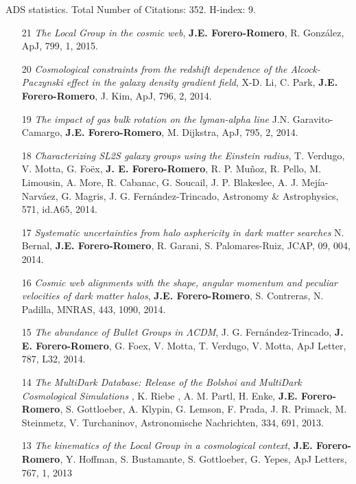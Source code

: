 \documentclass[letterpaper,11pt,onecolumn]{article}
\begin{document}
ADS statistics. Total Number of Citations: 352. H-index: 9.
\begin{enumerate}



\item[21]{\it The Local Group in the cosmic web}, {\bf
  J.E. Forero-Romero}, R. Gonz\'alez, ApJ, 799, 1, 2015.

\item[20]{\it Cosmological constraints from the redshift dependence of
  the Alcock-Paczynski effect in the galaxy density gradient field},
  X-D. Li, C. Park, {\bf J.E. Forero-Romero}, J. Kim, ApJ, 796, 2,
  2014.


\item[19]{\it The impact of gas bulk rotation on the lyman-alpha line}
  J.N. Garavito-Camargo,  {\bf J.E. Forero-Romero}, M. Dijkstra, ApJ,
  795, 2, 2014. 
 

\item[18]{\it  Characterizing SL2S galaxy groups using the Einstein
  radius}, T. Verdugo, V. Motta, G. Fo\"ex, {\bf J. E. Forero-Romero},
  R. P. Mu\~noz, R. Pello, M. Limousin, A. More, R. Cabanac, G. Soucail,
  J. P. Blakeslee, A. J. Mej\'ia-Narv\'aez, G. Magris,
  J. G. Fern\'andez-Trincado, Astronomy \& Astrophysics, 571, id.A65, 2014.


\item[17]{\it Systematic uncertainties from halo asphericity in dark
  matter searches}  N. Bernal, {\bf J.E. Forero-Romero}, R. Garani,
  S. Palomares-Ruiz, JCAP, 09, 004, 2014.

\item[16]{\it Cosmic web alignments with the shape, angular momentum
  and peculiar velocities of dark matter halos}, 
  {\bf J.E. Forero-Romero}, S. Contreras, N. Padilla, MNRAS, 443,
  1090, 2014. 

\item[15]{\it The abundance of Bullet Groups in $\Lambda$CDM},
  J. G. Fern\'andez-Trincado, {\bf J. E. Forero-Romero}, G. Foex,
  V. Motta, T. Verdugo, V. Motta, ApJ Letter, 787, L32, 2014.

\item[14]{\it The MultiDark Database: Release of the Bolshoi and
  MultiDark Cosmological Simulations} , K. Riebe , A. M. Partl,
  H. Enke, {\bf J.E. Forero-Romero}, S. Gottloeber, A. Klypin,
  G. Lemson, F. Prada, J. R. Primack, M. Steinmetz, V. Turchaninov,
  Astronomische Nachrichten, 334, 691, 2013. 

\item[13] {\it The kinematics of the Local Group in a cosmological context}, 
{\bf J.E. Forero-Romero}, Y. Hoffman, S. Bustamante, S. Gottloeber,
G. Yepes, ApJ Letters, 767, 1, 2013 



\end{enumerate}
\end{document}
